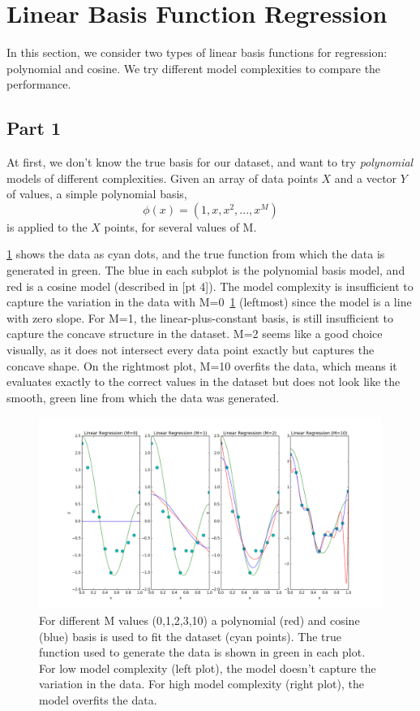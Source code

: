 \section{Linear Basis Function Regression} \label{sec:prob2}
In this section, we consider two types of linear basis functions for regression: polynomial and cosine. We try different model complexities to compare the performance.

\subsection{Part 1}
At first, we don't know the true basis for our dataset, and want to try \textit{polynomial} models of different complexities.
Given an array of data points $X$ and a vector $Y$ of values, a simple polynomial basis,
\begin{equation}
	\phi(x)=(1, x, x^2, ... , x^M)
\end{equation}
is applied to the $X$ points, for several values of M.

\cref{fig:2_1_m} shows the data as cyan dots, and the true function from which the data is generated in green.
The blue in each subplot is the polynomial basis model, and red is a cosine model (described in [pt 4]).
The model complexity is insufficient to capture the variation in the data with M=0~\cref{fig:2_1_m} (leftmost) since the model is a line with zero slope.
For M=1, the linear-plus-constant basis, is still insufficient to capture the concave structure in the dataset.
M=2 seems like a good choice visually, as it does not intersect every data point exactly but captures the concave shape.
On the rightmost plot, M=10 overfits the data, which means it evaluates exactly to the correct values in the dataset but does not look like the smooth, green line from which the data was generated.


\begin{figure}
	\centering
	\includegraphics [trim=0 0 0 0, clip, angle=0, width=0.8\columnwidth,
	keepaspectratio]{figures/2_1_m}
	\caption{For different M values (0,1,2,3,10) a polynomial (red) and cosine (blue) basis is used to fit the dataset (cyan points). The true function used to generate the data is shown in green in each plot. For low model complexity (left plot), the model doesn't capture the variation in the data. For high model complexity (right plot), the model overfits the data.} 
	\label{fig:2_1_m} 
\end{figure}

